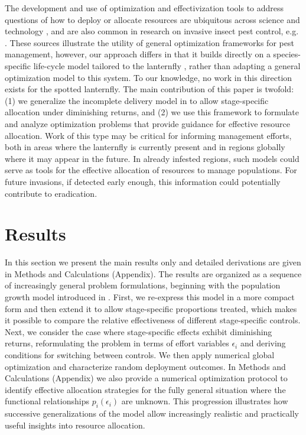 \documentclass[onecolumn]{article}
\begin{document}
The development and use of optimization and effectivization tools to address questions of how to deploy or allocate resources are ubiquitous across science and technology \citep{Diwekar2020}, and are also common in research on invasive insect pest control, e.g. \citep{Yemshanov2017,Edholm2018,Buyuktahtakin2018,Thompson2021}. These sources illustrate the utility of general optimization frameworks for pest management, however, our approach differs in that it builds directly on a species-specific life-cycle model tailored to the lanternfly \citep{Strombom2021}, rather than adapting a general optimization model to this system. To our knowledge, no work in this direction exists for the spotted lanternfly. The main contribution of this paper is twofold: (1) we generalize the incomplete delivery model in \citep{Strombom2021} to allow stage-specific allocation under diminishing returns, and (2) we use this framework to formulate and analyze optimization problems that provide guidance for effective resource allocation. Work of this type may be critical for informing management efforts, both in areas where the lanternfly is currently present and in regions globally where it may appear in the future. In already infested regions, such models could serve as tools for the effective allocation of resources to manage populations. For future invasions, if detected early enough, this information could potentially contribute to eradication. 

\section*{Results}
In this section we present the main results only and detailed derivations are given in Methods and Calculations (Appendix). The results are organized as a sequence of increasingly general problem formulations, beginning with the population growth model introduced in \citep{Strombom2021}. First, we re-express this model in a more compact form and then extend it to allow stage-specific proportions treated, which makes it possible to compare the relative effectiveness of different stage-specific controls. Next, we consider the case where stage-specific effects exhibit diminishing returns, reformulating the problem in terms of effort variables $\epsilon_i$ and deriving conditions for switching between controls. We then apply numerical global optimization and characterize random deployment outcomes. In Methods and Calculations (Appendix) we also provide a numerical optimization protocol to identify effective allocation strategies for the fully general situation where the functional relationships $p_i(\epsilon_i)$ are unknown. This progression illustrates how successive generalizations of the model allow increasingly realistic and practically useful insights into resource allocation.
\end{document}
